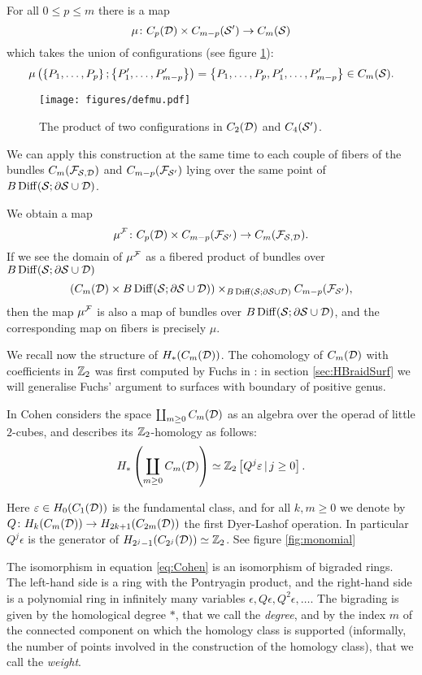 \begin{defn}
For all $0\leq p\leq m$ there is a map
\[
 \mu\colon C_p(\D)\times C_{m-p}(\S')\to \cms
\]
which takes the union of configurations (see figure \ref{fig:defmu}):
 \[
  \mu\pa{\set{P_1,\dots,P_p};\set{P'_1,\dots,P'_{m-p}}}=\set{P_1,\dots,P_p,P'_1,\dots,P'_{m-p}}\in\cms.
 \]
\begin{figure}\centering
 \texttt{[image: figures/defmu.pdf]}
 \caption{The product of two configurations in $C_2(\D)$ and $C_4(\S')$.}
\label{fig:defmu}
\end{figure}
 
We can apply this construction at the same time to each couple of fibers of the bundles $C_m(\cF_{\S,\D})$ and $C_{m-p}(\cF_{\S'})$
lying over the same point of $ B\Diff(\S;\partial\S\cup\D)$.

We obtain a map
\[
 \mu^{\cF}\colon C_p(\D)\times C_{m-p}(\cF_{\S'})\to C_m(\cF_{\S,\D}).
\]
If we see the domain of $\mu^{\cF}$ as a fibered product of bundles over $B\Diff(\S;\partial\S\cup\D)$
\[
 \pa{C_m(\D)\times B\Diff(\S;\partial\S\cup\D)}\times_{B\Diff(\S;\partial\S\cup\D)}C_{m-p}(\cF_{\S'}),
\]
then the map $\mu^{\cF}$ is also a map of bundles over $B\Diff(\S;\partial\S\cup\D)$, and the corresponding
map on fibers is precisely $\mu$.
\end{defn}

We recall now the structure of $H_*(C_m(\D))$.
The cohomology of $C_m(\D)$ with coefficients in $\Z_2$ was first computed by Fuchs in
\cite{Fuchs:CohomBraidModtwo}: in section
\ref{sec:HBraidSurf} we will generalise  Fuchs' argument to surfaces with boundary of positive genus.

In \cite[Chap.III]{CLM} Cohen considers the space $\coprod_{m\geq 0}C_m(\D)$ as an
algebra over the operad of little $2$-cubes, and describes its
$\Z_2$-homology as follows:
\begin{equation}
 \label{eq:Cohen}
H_*\pa{\coprod_{m\geq 0}C_m(\D)}\simeq \Z_2\left[Q^j\epsilon \, |\, j\geq 0\right].
\end{equation}

Here $\epsilon\in H_0(C_1(\D))$ is the fundamental class, and for all
$k,m\geq 0$ we denote by $Q\colon H_k(C_m(\D))\to H_{2k+1}(C_{2m}(\D))$
the first Dyer-Lashof operation. In particular $Q^j\epsilon$ is the generator of
$H_{2^j-1}(C_{2^j}(\D))\simeq\Z_2$. See figure \ref{fig:monomial}

The isomorphism in equation \eqref{eq:Cohen} is
an isomorphism of bigraded rings. The left-hand side is a ring with the Pontryagin product,
and the right-hand side is a polynomial ring in infinitely many variables $\epsilon,Q\epsilon,Q^2\epsilon,\dots$.
The bigrading is given by the homological degree
$*$, that we call the \emph{degree},
and by the index $m$ of the connected component
on which the homology class is supported (informally, the number of points
involved in the construction of the homology class), that we call the \emph{weight}.

